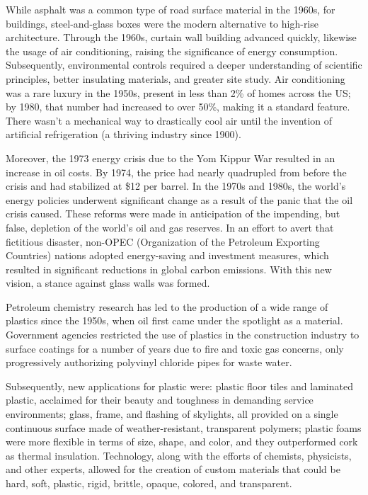 While asphalt was a common type of road surface material in the 1960s,\autocite{elhacham2020global} for buildings, steel-and-glass boxes were the modern alternative to high-rise architecture. Through the 1960s, curtain wall building advanced quickly,\autocite{sharp2002twentieth} likewise the usage of air conditioning, raising the significance of energy consumption. Subsequently, environmental controls required a deeper understanding of scientific principles, better insulating materials, and greater site study.\autocite{jester2014twentieth} Air conditioning was a rare luxury in the 1950s, present in less than 2\% of homes across the US; by 1980, that number had increased to over 50\%, making it a standard feature.\autocite{biddle2008explaining} There wasn't a mechanical way to drastically cool air until the invention of artificial refrigeration (a thriving industry since 1900).\autocite{nagengast1999early}

Moreover, the 1973 energy crisis due to the Yom Kippur War resulted in an increase in oil costs. By 1974, the price had nearly quadrupled from before the crisis and had stabilized at \$12 per barrel.\autocite{ross20131973} In the 1970s and 1980s, the world's energy policies underwent significant change as a result of the panic that the oil crisis caused. These reforms were made in anticipation of the impending, but false, depletion of the world's oil and gas reserves. In an effort to avert that fictitious disaster, non-OPEC (Organization of the Petroleum Exporting Countries) nations adopted energy-saving and investment measures,\autocite{wagner2009organization} which resulted in significant reductions in global carbon emissions.\autocite{issawi19781973} With this new vision, a stance against glass walls was formed.\autocite{jester2014twentieth}

Petroleum chemistry research has led to the production of a wide range of plastics since the 1950s, when oil first came under the spotlight as a material.\autocite{krausmann2009growth} Government agencies restricted the use of plastics in the construction industry to surface coatings for a number of years due to fire and toxic gas concerns, only progressively authorizing polyvinyl chloride pipes for waste water.\autocite{koehler1955plastics}

Subsequently, new applications for plastic were: plastic floor tiles and laminated plastic, acclaimed for their beauty and toughness in demanding service environments; glass, frame, and flashing of skylights, all provided on a single continuous surface made of weather-resistant, transparent polymers; plastic foams were more flexible in terms of size, shape, and color, and they outperformed cork as thermal insulation. Technology, along with the efforts of chemists, physicists, and other experts, allowed for the creation of custom materials that could be hard, soft, plastic, rigid, brittle, opaque, colored, and transparent. 

